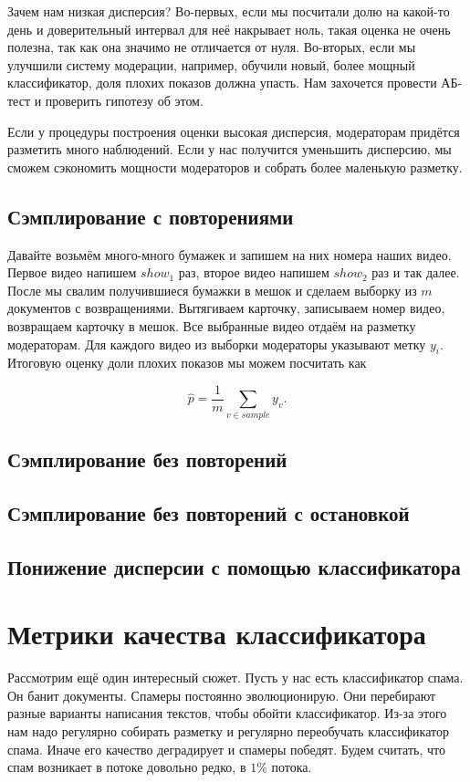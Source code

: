\documentclass[12pt, a4paper, oneside]{article}
\begin{document}
Зачем нам низкая дисперсия? Во-первых, если мы посчитали долю на какой-то день и доверительный интервал для неё накрывает ноль, такая оценка не очень полезна, так как она значимо не отличается от нуля. Во-вторых, если мы улучшили систему модерации, например, обучили новый, более мощный классификатор, доля плохих показов должна упасть. Нам захочется провести АБ-тест и проверить гипотезу об этом.

Если у процедуры построения оценки высокая дисперсия, модераторам придётся разметить много наблюдений. Если у нас получится уменьшить дисперсию, мы сможем сэкономить мощности модераторов и собрать более маленькую разметку. 

\subsection{Сэмплирование с повторениями}

Давайте возьмём много-много бумажек и запишем на них номера наших видео. Первое видео напишем $show_1$ раз, второе видео напишем $show_2$ раз и так далее. После мы свалим получившиеся бумажки в мешок и сделаем выборку из $m$ документов с возвращениями. Вытягиваем карточку, записываем номер видео, возвращаем карточку в мешок. Все выбранные видео отдаём на разметку модераторам. Для каждого видео из выборки модераторы указывают метку $y_i$.  Итоговую оценку доли плохих показов мы можем посчитать как 

\[
\hat{p} = \frac{1}{m} \sum_{v \in sample} y_v. 
\]

\subsection{Сэмплирование без повторений}

\subsection{Сэмплирование без повторений с остановкой}

\subsection{Понижение дисперсии с помощью классификатора}


\section{Метрики качества классификатора}

Рассмотрим ещё один интересный сюжет. Пусть у нас есть классификатор спама. Он банит документы. Спамеры постоянно эволюционирую. Они перебирают разные варианты написания текстов, чтобы обойти классификатор. Из-за этого нам надо регулярно собирать разметку и регулярно переобучать классификатор спама. Иначе его качество деградирует и спамеры победят. Будем считать, что спам возникает в потоке довольно редко, в $1\%$ потока.
\end{document}
